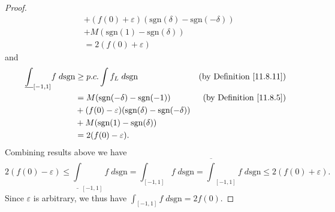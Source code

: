 \begin{proof}
\begin{align*}
                                                    & + (f(0) + \varepsilon) (\text{sgn}(\delta) - \text{sgn}(-\delta))                                        \\
                                                    & + M (\text{sgn}(1) - \text{sgn}(\delta))                                                                 \\
                                                    & = 2(f(0) + \varepsilon)
    \end{align*}
    and
    \begin{align*}
        \underline{\int}_{[-1, 1]} f \; d \text{sgn} & \geq p.c. \int f_L \; d \text{sgn}                                & \text{(by Definition \ref{11.8.11})} \\
                                                     & = M (\text{sgn}(-\delta) - \text{sgn}(-1))                        & \text{(by Definition \ref{11.8.5})}  \\
                                                     & + (f(0) - \varepsilon) (\text{sgn}(\delta) - \text{sgn}(-\delta))                                        \\
                                                     & + M (\text{sgn}(1) - \text{sgn}(\delta))                                                                 \\
                                                     & = 2(f(0) - \varepsilon).
    \end{align*}
    Combining results above we have
    \[
        2(f(0) - \varepsilon) \leq \underline{\int}_{[-1, 1]} f \; d \text{sgn} = \int_{[-1, 1]} f \; d \text{sgn} = \overline{\int}_{[-1, 1]} f \; d \text{sgn} \leq 2(f(0) + \varepsilon).
    \]
    Since \(\varepsilon\) is arbitrary, we thus have \(\int_{[-1, 1]} f \; d \text{sgn} = 2f(0)\).
\end{proof}